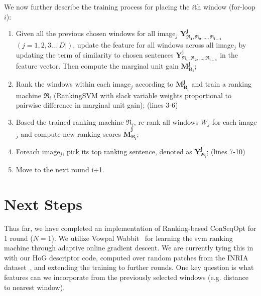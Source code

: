 \documentclass[11pt]{article}
\begin{document}
   We now further describe the training process for placing the $i$th window (for-loop $i$): 
   \begin{enumerate}
   \item Given all the previous chosen windows for all image$_j$ $\mathbf{Y^j_{\Re_1,\Re_2,\ldots,\Re_{i-1}}}$ $(j = 1,2,3...|D|)$, update the feature for all windows across all image$_j$ by updating the term of similarity to chosen sentences $\mathbf{Y^j_{\Re_1,\Re_2,\ldots,\Re_{i-1}}}$ in the feature vector. Then compute the marginal unit gain $\mathbf{M^j_{B_i}}$;   
   \item Rank the windows within each image$_j$ according to $\mathbf{M^j_{B_i}}$ and train a ranking machine $\Re_i$ (RankingSVM with slack variable weights proportional to pairwise difference in marginal unit gain); (lines 3-6)
   
   \item Based the trained ranking machine $\Re_i$, re-rank all windows $W_j$ for each image$_j$ and compute new ranking scores $\mathbf{\tilde{M}^j_{B_i}}$; 
   \item Foreach image$_j$, pick its top ranking sentence, denoted as $\mathbf{Y_{\Re_i}^j}$; (lines 7-10)
   \item Move to the next round i+1.   
   \end {enumerate}



\section{Next Steps}

Thus far, we have completed an implementation of Ranking-based ConSeqOpt for 1 round ($N=1$). We utilize Vowpal Wabbit~\cite{vw} for learning the svm ranking machine through adaptive online gradient descent. We are currently tying this in with our HoG descriptor code, computed over random patches from the INRIA dataset~\cite{HoG}, and extending the training to further rounds. One key question is what features can we incorporate from the previously selected windows (e.g. distance to nearest window).




\end{document}
